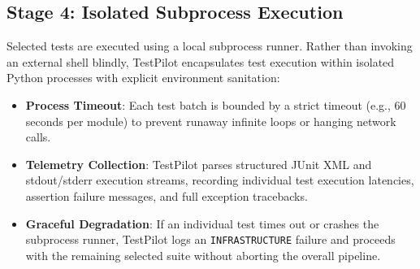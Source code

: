 \documentclass[12pt,onecolumn,draftclsnofoot]{IEEEtran}
\begin{document}
\subsection{Stage 4: Isolated Subprocess Execution}
Selected tests are executed using a local subprocess runner. Rather than invoking an external shell blindly, TestPilot encapsulates test execution within isolated Python processes with explicit environment sanitation:
\begin{itemize}
    \item \textbf{Process Timeout}: Each test batch is bounded by a strict timeout (e.g., 60 seconds per module) to prevent runaway infinite loops or hanging network calls.
    \item \textbf{Telemetry Collection}: TestPilot parses structured JUnit XML and stdout/stderr execution streams, recording individual test execution latencies, assertion failure messages, and full exception tracebacks.
    \item \textbf{Graceful Degradation}: If an individual test times out or crashes the subprocess runner, TestPilot logs an \texttt{INFRASTRUCTURE} failure and proceeds with the remaining selected suite without aborting the overall pipeline.
\end{itemize}
\end{document}
